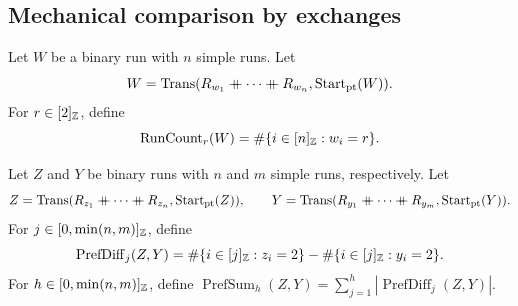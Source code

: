 \subsection{Mechanical comparison by exchanges}
\begin{definition}\label{def:binary-run-count}
Let $W$ be a binary run with $n$ simple runs. Let
\[
 W=\operatorname{Trans}(R_{w_1}\mathbin{+\mkern-10mu+} \cdots\mathbin{+\mkern-10mu+} R_{w_n},\operatorname{Start}_{\mathrm{pt}}(W)).
\]
For $r\in[2]_{\mathbb Z}$, define
\[
 \operatorname{RunCount}_r(W)=\#\{i\in[n]_{\mathbb Z}:w_i=r\}.
\]
\end{definition}

\begin{definition}\label{def:prefix-discrepancy}
Let $Z$ and $Y$ be binary runs with $n$ and $m$ simple runs, respectively. Let
\[
 Z=\operatorname{Trans}(R_{z_1}\ccn \cdots\ccn R_{z_n},\operatorname{Start}_{\mathrm{pt}}(Z)),\qquad
 Y=\operatorname{Trans}(R_{y_1}\ccn \cdots\ccn R_{y_m},\operatorname{Start}_{\mathrm{pt}}(Y)).
\]
For $j\in[0,\min(n,m)]_{\mathbb Z}$, define
\[
 \operatorname{PrefDiff}_j(Z,Y)=
 \#\{i\in[j]_{\mathbb Z}:z_i=2\}-\#\{i\in[j]_{\mathbb Z}:y_i=2\}.
\]
For $h\in[0,\min(n,m)]_{\mathbb Z}$, define
$\operatorname{PrefSum}_h(Z,Y)=\sum_{j=1}^h|\operatorname{PrefDiff}_j(Z,Y)|$.
\end{definition}

